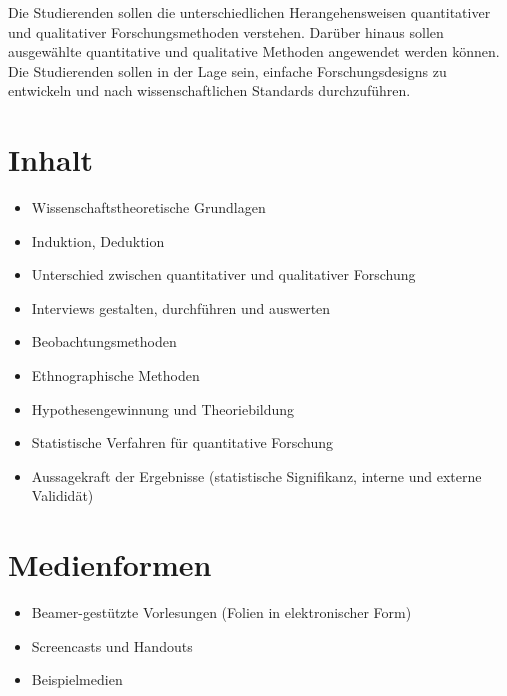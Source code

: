 Die Studierenden sollen die unterschiedlichen Herangehensweisen
quantitativer und qualitativer Forschungsmethoden verstehen. Darüber
hinaus sollen ausgewählte quantitative und qualitative Methoden
angewendet werden können. Die Studierenden sollen in der Lage sein,
einfache Forschungsdesigns zu entwickeln und nach wissenschaftlichen
Standards durchzuführen.

\hypertarget{inhaltpathlabelmi-2017modulbeschreibungen-bachelorba_sc_empirische-forschungsmethoden}{%
\section*{Inhalt\label{/mi-2017/modulbeschreibungen-bachelor/BA_SC_empirische-forschungsmethoden}}\label{inhaltpathlabelmi-2017modulbeschreibungen-bachelorba_sc_empirische-forschungsmethoden}}

\begin{itemize}
\tightlist
\item
  Wissenschaftstheoretische Grundlagen
\item
  Induktion, Deduktion
\item
  Unterschied zwischen quantitativer und qualitativer Forschung
\item
  Interviews gestalten, durchführen und auswerten
\item
  Beobachtungsmethoden
\item
  Ethnographische Methoden
\item
  Hypothesengewinnung und Theoriebildung
\item
  Statistische Verfahren für quantitative Forschung
\item
  Aussagekraft der Ergebnisse (statistische Signifikanz, interne und
  externe Valididät)
\end{itemize}

\hypertarget{medienformenpathlabelmi-2017modulbeschreibungen-bachelorba_sc_empirische-forschungsmethoden}{%
\section*{Medienformen\label{/mi-2017/modulbeschreibungen-bachelor/BA_SC_empirische-forschungsmethoden}}\label{medienformenpathlabelmi-2017modulbeschreibungen-bachelorba_sc_empirische-forschungsmethoden}}

\begin{itemize}
\tightlist
\item
  Beamer-gestützte Vorlesungen (Folien in elektronischer Form)
\item
  Screencasts und Handouts
\item
  Beispielmedien
\end{itemize}

